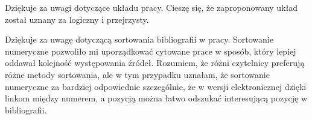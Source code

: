 \begin{frame}[t]
    \begin{block}{\tb}
\end{block}

\begin{block}{\tb}
\end{block}

Dziękuje za uwagi dotyczące układu  pracy. Cieszę się, że zaproponowany  układ został uznany za logiczny i przejrzysty. 


\begin{block}{\tb}
\end{block}

Dziękuje za uwagę dotyczącą sortowania bibliografii w pracy. 
Sortowanie numeryczne pozwoliło mi uporządkować cytowane prace w sposób, który lepiej oddawał kolejność występowania źródeł. 
Rozumiem, że różni czytelnicy preferują różne metody sortowania, ale w tym przypadku uznałam, że sortowanie numeryczne za bardziej odpowiednie szczególnie, że w wersji elektronicznej dzięki linkom między numerem, a pozycją można łatwo odszukać interesującą pozycję w bibliografii.


\end{frame}





